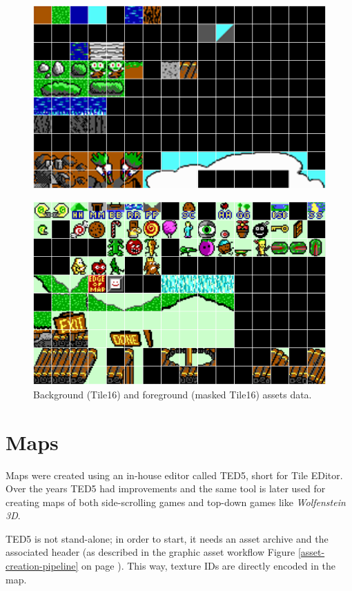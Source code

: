 \documentclass[book.tex]{subfiles}
\begin{document}
\begin{figure}[H] 
  \centering 
  \includegraphics[width=\textwidth, frame]{screenshots_300dpi/tile16_assets.png}
\end{figure} 

\begin{figure}[H] 
  \centering 
  \includegraphics[width=\textwidth, frame]{screenshots_300dpi/tile16M_assets.png}
  \caption{Background (Tile16) and foreground (masked Tile16) assets data.}
  \label{fig:tile16_assets}
\end{figure} 



\section{Maps}
Maps were created using an in-house editor called TED5, short for Tile EDitor. Over the years TED5 had improvements and the same tool is later used for creating maps of both side-scrolling games and top-down games like \textit{Wolfenstein 3D}.\\
\par
 TED5 is not stand-alone; in order to start, it needs an asset archive and the  associated header (as described in the graphic asset workflow Figure \ref{asset-creation-pipeline} on page \pageref{asset-creation-pipeline}). This way, texture IDs are directly encoded in the map.\\
\end{document}
